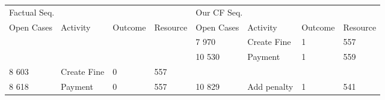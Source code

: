 \begin{tabular}{llllllll}
\toprule
\multicolumn{4}{l}{Factual Seq.} & \multicolumn{4}{l}{Our CF Seq.} \\
Open Cases & Activity & Outcome & Resource & Open Cases & Activity & Outcome & Resource \\
\midrule
 &  &  &  & 7 970 & Create Fine & 1 & 557 \\
 &  &  &  & 10 530 & Payment & 1 & 559 \\
8 603 & Create Fine & 0 & 557 &  &  &  &  \\
8 618 & Payment & 0 & 557 & 10 829 & Add penalty & 1 & 541 \\
\bottomrule
\end{tabular}
